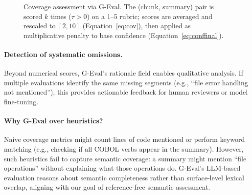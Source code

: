 \begin{figure}[!h]
\vspace{0.5cm}
\centering
{}
\vspace{-0.3cm}
\caption{Coverage assessment via G-Eval. The (chunk, summary) pair is scored $k$ times
($\tau > 0$) on a 1--5 rubric; scores are averaged and rescaled to $[2,10]$
(Equation~\eqref{eq:cov}), then applied as multiplicative penalty to base confidence
(Equation~\eqref{eq:conffinal}).}
\label{fig:geval}
\end{figure}

\paragraph{Detection of systematic omissions.}
Beyond numerical scores, G-Eval's rationale field enables qualitative analysis. If
multiple evaluations identify the same missing segments (e.g., ``file error handling not
mentioned''), this provides actionable feedback for human reviewers or model fine-tuning.

\paragraph{Why G-Eval over heuristics?}
Naive coverage metrics might count lines of code mentioned or perform keyword matching
(e.g., checking if all COBOL verbs appear in the summary). However, such heuristics fail
to capture semantic coverage: a summary might mention ``file operations'' without
explaining what those operations do. G-Eval's LLM-based evaluation reasons about semantic
completeness rather than surface-level lexical overlap, aligning with our goal of
reference-free semantic assessment.

